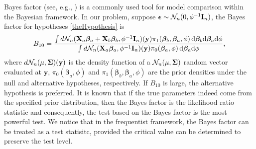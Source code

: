 \documentclass[bj]{imsart}
\newcommand{\By}{\mathbf{y}}    \newcommand{\Bz}{\mathbf{z}}
\newcommand{\bfsym}[1]{\ensuremath{\boldsymbol{#1}}}
\def\bbeta{\bfsym \beta}
\theoremstyle{plain}
\theoremstyle{definition}
\theoremstyle{remark}
\begin{document}
Bayes factor (see, e.g., \citep{Robert1995Bayes}) is a commonly used tool for model comparison within the Bayesian framework.
In our problem, suppose $\bepsilon \sim \mathcal N_n (0,\phi^{-1} \BI_n)$, the Bayes factor for hypotheses \eqref{theHypothesis} is
\begin{equation*}
    B_{10}= \frac {
        \int d\mathcal N_n(\BX_a\bbeta_a + \BX_b\bbeta_b, \phi^{-1}\BI_n) (\By) \pi_1(\bbeta_b,\bbeta_a,\phi)\, \mathrm d\bbeta_b \mathrm d\bbeta_a \mathrm d\phi
}{
    \int d\mathcal N_n(\BX_a\bbeta_a, \phi^{-1} \BI_n)(\By) \pi_0(\bbeta_a,\phi) \, \mathrm d\bbeta_a \mathrm d\phi
    },
\end{equation*}
where $d\mathcal N_n(\mu, \bSigma)(\By)$ is the density function of a $\mathcal N_n(\mu,\bSigma) $ random vector evaluated at $\By$,  $\pi_0(\bbeta_a,\phi)$ and $\pi_1(\bbeta_b,\bbeta_a,\phi)$ are the prior densities under the null and alternative hypotheses, respectively.
If $B_{10}$ is large, the alternative hypothesis is preferred.
It is known that if the true parameters indeed come from the specified prior distribution, then the Bayes factor is the likelihood ratio statistic and consequently, the test based on the Bayes factor is the most powerful test.
We notice that in the frequentist framework, the Bayes factor can be treated as a test statisitc, provided the critical value can be determined to preserve the test level.
\end{document}
